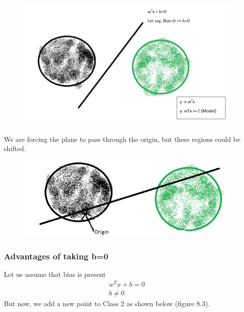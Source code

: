 \documentclass[11pt, twosides]{article}
\begin{document}
\begin{figure}[htbp]
\begin{center}
\includegraphics[scale=0.33]{419_1.jpeg}
\caption{}
\end{center}
\end{figure}

We are forcing the plane to pass through the origin, but these regions could be shifted.

\begin{figure}[htbp]
\begin{center}
\includegraphics[scale=0.33]{419_2.jpeg}
\caption{}
\end{center}
\end{figure}

\subsubsection{Advantages of taking b=0}

Let us assume that bias is present
\begin{align}
{w^Tx} + b =0 \\
b \neq 0
\end{align}
\newpage
But now, we add a new point to Class 2 as shown below (figure 8.3).
\end{document}
